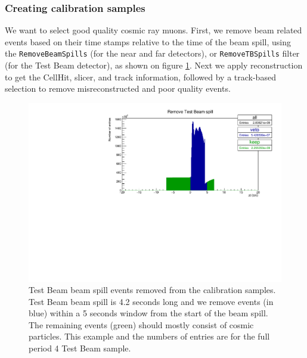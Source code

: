 \documentclass[12pt,a4paper]{article}
\begin{document}

\subsubsection*{Creating calibration samples}

We want to select good quality cosmic ray muons. First, we remove beam related events based on their time stamps relative to the time of the beam spill, using the \texttt{RemoveBeamSpills} (for the near and far detectors), or \texttt{RemoveTBSpills} filter (for the Test Beam detector), as shown on figure \ref{figRemoveBeamSpill}. Next we apply reconstruction to get the CellHit, slicer, and track information, followed by a track-based selection to remove misreconstructed and poor quality events.

\begin{figure}[hbtp]
\centering
\includegraphics[width=\textwidth]{Plots/RemoveTBSpills.pdf}
\caption{Test Beam beam spill events removed from the calibration samples. Test Beam beam spill is 4.2 seconds long and we remove events (in blue) within a 5 seconds window from the start of the beam spill. The remaining events (green) should mostly consist of cosmic particles. This example and the numbers of entries are for the full period 4 Test Beam sample.}
\label{figRemoveBeamSpill}
\end{figure}
\end{document}
